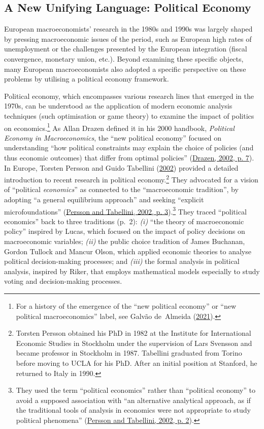 \documentclass[
  12pt,
  onecolumn]{article}
\begin{document}
\hypertarget{political-economics}{%
\subsection{A New Unifying Language: Political Economy}\label{political-economics}}

European macroeconomists' research in the 1980s and 1990s was largely shaped by pressing macroeconomic issues of the period, such as European high rates of unemployment or the challenges presented by the European integration (fiscal convergence, monetary union, etc.). Beyond examining these specific objects, many European macroeconomists also adopted a specific perspective on these problems by utilising a political economy framework.

Political economy, which encompasses various research lines that emerged in the 1970s, can be understood as the application of modern economic analysis techniques (such optimisation or game theory) to examine the impact of politics on economics.\footnote{For a history of the emergence of the ``new political economy'' or ``new political macroeconomics'' label, see Galvão de~Almeida (\protect\hyperlink{ref-galvaodealmeida2021}{2021}).} As Allan Drazen defined it in his 2000 handbook, \emph{Political Economy in Macroeconomics}, the ``new political economy'' focused on understanding ``how political constraints may explain the choice of policies (and thus economic outcomes) that differ from optimal policies'' (\protect\hyperlink{ref-drazen2002}{Drazen, 2002, p. 7}). In Europe, Torsten Persson and Guido Tabellini (\protect\hyperlink{ref-persson2002}{2002}) provided a detailed introduction to recent research in political economy.\footnote{Torsten Persson obtained his PhD in 1982 at the Institute for International Economic Studies in Stockholm under the supervision of Lars Svensson and became professor in Stockholm in 1987. Tabellini graduated from Torino before moving to UCLA for his PhD. After an initial position at Stanford, he returned to Italy in 1990.} They advocated for a vision of ``political \emph{economics}'' as connected to the ``macroeconomic tradition'', by adopting ``a general equilibrium approach'' and seeking ``explicit microfoundations'' (\protect\hyperlink{ref-persson2002}{Persson and Tabellini, 2002, p. 3}).\footnote{They used the term ``political economics'' rather than ``political economy'' to avoid a supposed association with ``an alternative analytical approach, as if the traditional tools of analysis in economics were not appropriate to study political phenomena'' (\protect\hyperlink{ref-persson2002}{Persson and Tabellini, 2002, p. 2}).} They traced ``political economics'' back to three traditions (p.~2): \emph{(i)} ``the theory of macroeconomic policy'' inspired by Lucas, which focused on the impact of policy decisions on macroeconomic variables; \emph{(ii)} the public choice tradition of James Buchanan, Gordon Tullock and Mancur Olson, which applied economic theories to analyse political decision-making processes; and \emph{(iii)} the formal analysis in political analysis, inspired by Riker, that employs mathematical models especially to study voting and decision-making processes.
\end{document}
